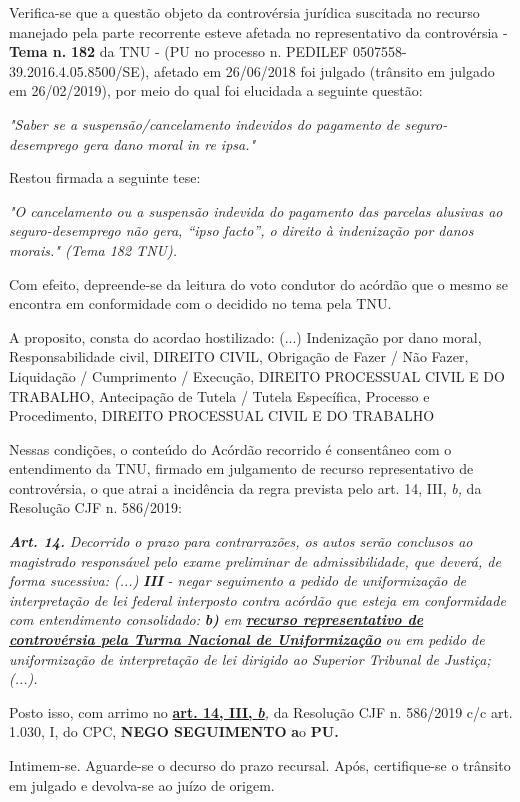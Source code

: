 \documentclass[12pt]{article}
\begin{document}
\justifying
\noindent Verifica-se que a questão objeto da controvérsia jurídica suscitada no recurso manejado pela parte recorrente esteve afetada no representativo da controvérsia - \textbf{Tema n. }\textbf{182} da TNU - (PU no processo n. PEDILEF 0507558-39.2016.4.05.8500/SE),  afetado em 26/06/2018 foi julgado (trânsito em julgado em 26/02/2019), por meio do qual foi elucidada a seguinte questão:

\noindent \textit{"Saber se a suspensão/cancelamento indevidos do pagamento de seguro-desemprego gera dano moral in re ipsa."}

\noindent Restou firmada a seguinte tese:

\noindent \textit{"O cancelamento ou a suspensão indevida do pagamento das parcelas alusivas ao seguro-desemprego não gera, “ipso facto”, o direito à indenização por danos morais." (Tema 182 TNU).}

\noindent Com efeito, depreende-se da leitura do voto condutor do acórdão que o mesmo se encontra em conformidade com o decidido no  tema pela TNU.

\noindent A proposito, consta do acordao hostilizado: (...) Indenização por dano moral, Responsabilidade civil, DIREITO CIVIL, Obrigação de Fazer / Não Fazer, Liquidação / Cumprimento / Execução, DIREITO PROCESSUAL CIVIL E DO TRABALHO, Antecipação de Tutela / Tutela Específica, Processo e Procedimento, DIREITO PROCESSUAL CIVIL E DO TRABALHO

\noindent Nessas condições, o conteúdo do Acórdão recorrido é consentâneo com o entendimento da TNU, firmado em julgamento de recurso representativo de controvérsia, o que atrai a incidência da regra prevista pelo art. 14, III, \textit{b,} da Resolução CJF n. 586/2019:

\noindent \textit{\textbf{Art. 14.}}\textit{ Decorrido o prazo para contrarrazões, os autos serão conclusos ao magistrado responsável pelo exame preliminar de admissibilidade, que deverá, de forma sucessiva: (...) }\textit{\textbf{III }}\textit{- negar seguimento a pedido de uniformização de interpretação de lei federal interposto contra acórdão que esteja em conformidade com entendimento consolidado: }\textit{\textbf{b)}}\textit{ em }\uline{\textit{\textbf{recurso representativo de controvérsia pela Turma Nacional de Uniformização}}}\textit{ ou em pedido de uniformização de interpretação de lei dirigido ao Superior Tribunal de Justiça;(...).}

\noindent Posto isso, com arrimo no \uline{\textbf{art. 14, III, }}\uline{\textit{\textbf{b}}}\textit{,} da Resolução CJF n. 586/2019 c/c art. 1.030, I, do CPC, \textbf{NEGO SEGUIMENTO }\textbf{a}o\textbf{ PU}\textbf{.}

\noindent Intimem-se. Aguarde-se o decurso do prazo recursal. Após, certifique-se o trânsito em julgado e devolva-se ao juízo de origem.
\end{document}
